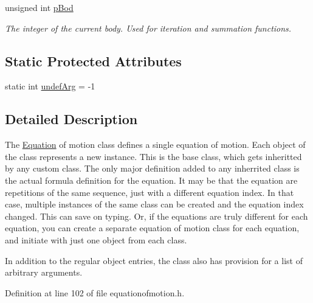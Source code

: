 \begin{DoxyCompactItemize}
unsigned int \hyperlink{classosea_1_1ofreq_1_1_equationof_motion_a5a1c11c4c4a827494a7772af0d0dddc6}{p\-Bod}
\begin{DoxyCompactList}\small\item\em The integer of the current body. Used for iteration and summation functions. \end{DoxyCompactList}\end{DoxyCompactItemize}
\subsection*{Static Protected Attributes}
\begin{DoxyCompactItemize}
\item 
static int \hyperlink{classosea_1_1ofreq_1_1_equationof_motion_ad00063eabf1b5075b04c6d2507acebd4}{undef\-Arg} = -\/1
\end{DoxyCompactItemize}


\subsection{Detailed Description}
The \hyperlink{classosea_1_1ofreq_1_1_equation}{Equation} of motion class defines a single equation of motion. Each object of the class represents a new instance. This is the base class, which gets inheritted by any custom class. The only major definition added to any inherrited class is the actual formula definition for the equation. It may be that the equation are repetitions of the same sequence, just with a different equation index. In that case, multiple instances of the same class can be created and the equation index changed. This can save on typing. Or, if the equations are truly different for each equation, you can create a separate equation of motion class for each equation, and initiate with just one object from each class.

In addition to the regular object entries, the class also has provision for a list of arbitrary arguments. 

Definition at line 102 of file equationofmotion.\-h.



